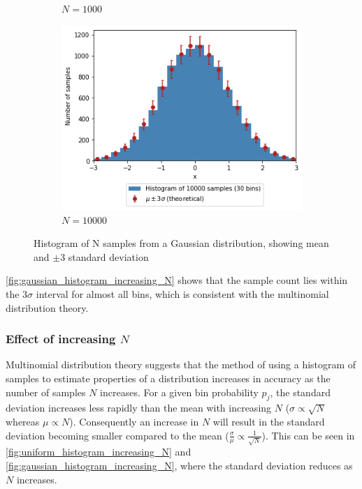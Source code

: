 \documentclass[a4paper]{article}
\begin{document}
\begin{figure}[h]
\begin{subfigure}[b]{0.3\textwidth}
        \caption{$N=1000$}
        \label{fig:gaussian_histogram_1000}
    \end{subfigure}
    \hfill
    \begin{subfigure}[b]{0.3\textwidth}
        \centering
        \includegraphics[width=\textwidth]{figures/gaussian_histogram_10000.png}
        \caption{$N=10000$}
        \label{fig:gaussian_histogram_10000}
    \end{subfigure}
    \caption{Histogram of N samples from a Gaussian distribution, showing mean and $\pm3$ standard deviation}
    \label{fig:gaussian_histogram_increasing_N}
\end{figure}

\autoref{fig:gaussian_histogram_increasing_N} shows that the sample count lies within the $3\sigma$ interval for almost
all bins, which is consistent with the multinomial distribution theory.


\subsubsection{Effect of increasing $N$}
Multinomial distribution theory suggests that the method of using a histogram of samples to estimate properties of a
distribution increases in accuracy as the number of samples $N$ increases.
For a given bin probability $p_j$, the standard deviation increases less rapidly than the mean with increasing $N$
($\sigma \propto \sqrt{N}$ whereas $\mu \propto N$).
Consequently an increase in $N$ will result in the standard deviation becoming smaller compared to the mean
($\frac{\sigma}{\mu} \propto \frac{1}{\sqrt{N}}$).
This can be seen in \autoref{fig:uniform_histogram_increasing_N} and \autoref{fig:gaussian_histogram_increasing_N},
where the standard deviation reduces as $N$ increases.
\end{document}
